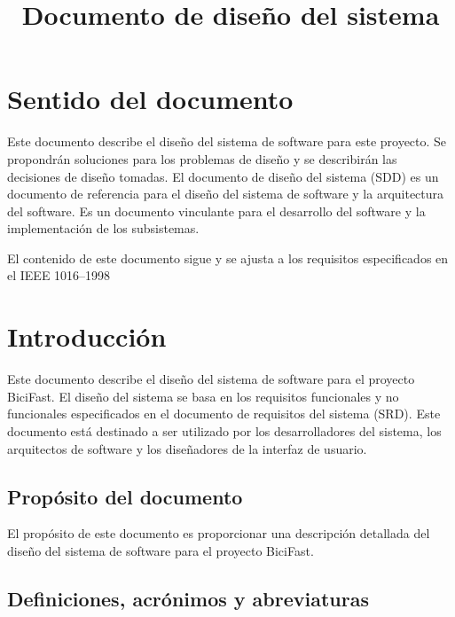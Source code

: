 \documentclass[a4paper,12pt]{article}
\makeatletter
\renewcommand{\maketitle}{\bgroup\setlength{\parindent}{0pt}
    \begin{flushleft}
    {\Huge\textbf{\@title}}
    \end{flushleft}\egroup
}
\makeatother
\begin{document}
    \title{Documento de diseño del sistema\\}
    \maketitle


    \section*{\color{black}Sentido del documento}

    Este documento describe el diseño del sistema de software para este proyecto.
    Se propondrán soluciones para los problemas de diseño y se describirán las decisiones de diseño tomadas.
    El documento de diseño del sistema (SDD) es un documento de referencia para el diseño del sistema de software y la arquitectura del software.
    Es un documento vinculante para el desarrollo del software y la implementación de los subsistemas.

    El contenido de este documento sigue y se ajusta a los requisitos especificados en el IEEE 1016--1998\autocite{IEEE1016-1998}


    \setcounter{tocdepth}{2}
    \tableofcontents


    \section{Introducción}\label{sec:introduccion}
    Este documento describe el diseño del sistema de software para el proyecto BiciFast.
    El diseño del sistema se basa en los requisitos funcionales y no funcionales especificados en el documento de requisitos del sistema (SRD).\autocite{SRD-BiciFast}
    Este documento está destinado a ser utilizado por los desarrolladores del sistema, los arquitectos de software y los diseñadores de la interfaz de usuario.

    \subsection{Propósito del documento}\label{subsec:proposito-del-documento}
    El propósito de este documento es proporcionar una descripción detallada del diseño del sistema de software para el proyecto BiciFast.

    \subsection{Definiciones, acrónimos y abreviaturas}\label{subsec:definiciones-acronimos-y-abreviaturas}
\end{document}
